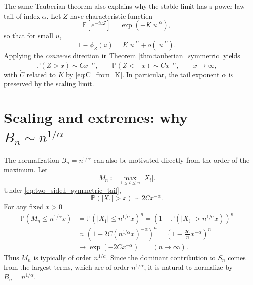 \documentclass[11pt]{article}
\begin{document}
The same Tauberian theorem also explains why the stable limit has a power-law tail of index $\alpha$. Let $Z$ have characteristic function
\begin{equation}\label{eq:stable_cf_symmetric}
{\mathbb E}[e^{-iuZ}] = \exp(-K|u|^\alpha),
\end{equation}
so that for small $u$,
\begin{equation}\label{eq:stable_small_u}
1-\phi_Z(u) = K|u|^\alpha + o(|u|^\alpha).
\end{equation}
Applying the \emph{converse} direction in Theorem \ref{thm:tauberian_symmetric} yields
\begin{equation}\label{eq:stable_tail_conclusion}
{\mathbb P}(Z>x)\sim \widetilde C x^{-\alpha},
\qquad
{\mathbb P}(Z<-x)\sim \widetilde C x^{-\alpha},
\qquad x\to\infty,
\end{equation}
with $\widetilde C$ related to $K$ by \eqref{eq:C_from_K}. In particular, the tail exponent $\alpha$ is preserved by the scaling limit.

\section{Scaling and extremes: why $B_n\sim n^{1/\alpha}$}\label{sec:scaling_extremes}

The normalization $B_n=n^{1/\alpha}$ can also be motivated directly from the order of the maximum. Let
\begin{equation}\label{eq:max_def}
M_n \coloneqq \max_{1\le i\le n} |X_i|.
\end{equation}
Under \eqref{eq:two_sided_symmetric_tail},
\begin{equation}\label{eq:abs_tail}
{\mathbb P}(|X_1|>x) \sim 2C x^{-\alpha}.
\end{equation}
For any fixed $x>0$,
\begin{align}
{\mathbb P}\!\left(M_n \le n^{1/\alpha}x\right)
&=
{\mathbb P}\!\left(|X_1|\le n^{1/\alpha}x\right)^n
=
\left(1-{\mathbb P}\!\left(|X_1|>n^{1/\alpha}x\right)\right)^n
\label{eq:max_cdf_1}\\
&\approx
\left(1- 2C (n^{1/\alpha}x)^{-\alpha}\right)^n
=
\left(1-\frac{2C}{n}x^{-\alpha}\right)^n
\label{eq:max_cdf_2}\\
&\longrightarrow \exp(-2C x^{-\alpha})
\qquad (n\to\infty).
\label{eq:max_limit}
\end{align}
Thus $M_n$ is typically of order $n^{1/\alpha}$. Since the dominant contribution to $S_n$ comes from the largest terms, which are of order $n^{1/\alpha}$, it is natural to normalize by $B_n = n^{1/\alpha}$.
\end{document}
